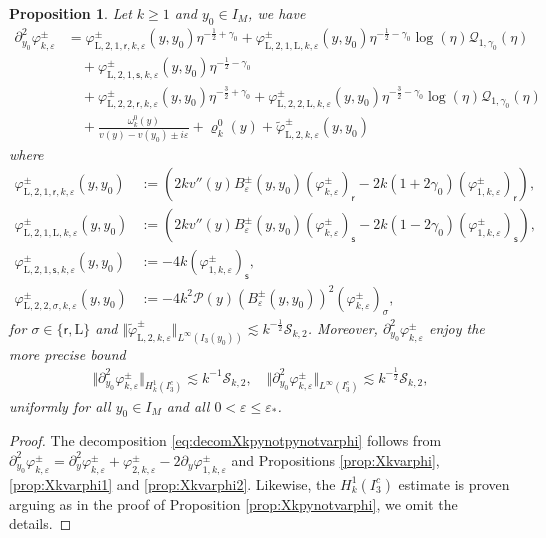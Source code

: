 \documentclass[11pt,reqno]{amsproc}
\newtheorem{proposition}{Proposition}[section]
\theoremstyle{definition}
\numberwithin{equation}{section}
\newcommand{\rL}{{\mathrm{L}}}
\newcommand{\Q}{{\mathcal{Q}}}
\newcommand{\sr}{{\mathsf{r}}}
\newcommand{\s}{{\mathsf{s}}}
\newcommand{\cS}{{\mathcal S}}
\newcommand{\ep}{\varepsilon}
\renewcommand{\P}{{\mathcal{P}}}
\begin{document}
\begin{proposition}\label{prop:LXkpynotpynotvarphi}
Let $k\geq 1$ and $y_0\in I_M$, we have
\begin{equation}\label{eq:decomLXkpynotpynotvarphi}
\begin{split}
\partial_{y_0}^2\varphi_{k,\ep}^\pm &= \varphi_{\rL,2,1,\sr,k,\ep}^\pm(y,y_0) \eta^{-\frac12+\gamma_0} + \varphi_{\rL,2,1,\rL,k,\ep}^\pm(y,y_0) \eta^{-\frac12-\gamma_0}\log(\eta)\Q_{1,\gamma_0}(\eta) \\
&\quad+ \varphi_{\rL,2,1,\s,k,\ep}^\pm(y,y_0) \eta^{-\frac12-\gamma_0} \\
&\quad + \varphi_{\rL,2,2,\sr,k,\ep}^\pm(y,y_0) \eta^{-\frac32+\gamma_0} + \varphi_{\rL,2,2,\rL,k,\ep}^\pm(y,y_0) \eta^{-\frac32-\gamma_0}\log(\eta) \Q_{1,\gamma_0}(\eta) \\ 
&\quad + \frac{\omega_k^0(y)}{v(y) - v(y_0) \pm i\ep} + \varrho_k^0(y) + \widetilde\varphi_{\rL,2,k,\ep}^\pm(y,y_0) 
\end{split}
\end{equation}
where
\begin{align*}
\varphi_{\rL,2,1,\sr,k,\ep}^\pm(y,y_0) &:= \left( 2kv''(y)B_{\ep}^\pm(y,y_0)  \left( \varphi_{k,\ep}^\pm \right)_\sr - 2k(1+2\gamma_0) \left( \varphi_{1,k,\ep}^\pm \right)_\sr \right),  \\
\varphi_{\rL,2,1,\rL,k,\ep}^\pm(y,y_0) &:=\left( 2kv''(y)B_{\ep}^\pm(y,y_0)  \left( \varphi_{k,\ep}^\pm \right)_\s - 2k(1-2\gamma_0) \left( \varphi_{1,k,\ep}^\pm \right)_\s \right), \\
\varphi_{\rL,2,1,\s,k,\ep}^\pm(y,y_0) &:=-4k \left( \varphi_{1,k,\ep}^\pm \right)_\s , \\
\varphi_{\rL,2,2,\sigma,k,\ep}^\pm(y,y_0) &:= - 4k^2\P(y) (B_{\ep}^\pm(y,y_0))^2  \left( \varphi_{k,\ep}^\pm \right)_\sigma, 
\end{align*}
for $\sigma \in \lbrace \sr, \rL \rbrace$ and $\Vert \widetilde{\varphi}_{\rL,2,k,\ep}^\pm \Vert_{L^\infty(I_3(y_0))} \lesssim k^{-\frac12}\cS_{k,2}$. Moreover, $\partial_{y_0}^2\varphi_{k,\ep}^\pm$ enjoy the more precise bound
\begin{align*}
\Vert \partial_{y_0}^2\varphi_{k,\ep}^\pm \Vert_{H_k^1(I_3^c)} \lesssim  k^{-1}\cS_{k,2}, \quad \Vert \partial_{y_0}^2\varphi_{k,\ep}^\pm \Vert_{L^\infty(I_3^c)} \lesssim  k^{-\frac12}\cS_{k,2},
\end{align*}
uniformly for all $y_0\in I_M$ and all $0 < \ep\leq \ep_*$.
\end{proposition}

\begin{proof}
The decomposition \eqref{eq:decomXkpynotpynotvarphi} follows from $\partial_{y_0}^2\varphi_{k,\ep}^\pm = \partial_y^2\varphi_{k,\ep}^\pm + \varphi_{2,k,\ep}^\pm -2\partial_y \varphi_{1,k,\ep}^\pm$ and Propositions \ref{prop:Xkvarphi}, \ref{prop:Xkvarphi1} and \ref{prop:Xkvarphi2}. Likewise, the ${H_k^1(I_3^c)}$ estimate is proven arguing as in the proof of Proposition \ref{prop:Xkpynotvarphi}, we omit the details.
\end{proof}
\end{document}
